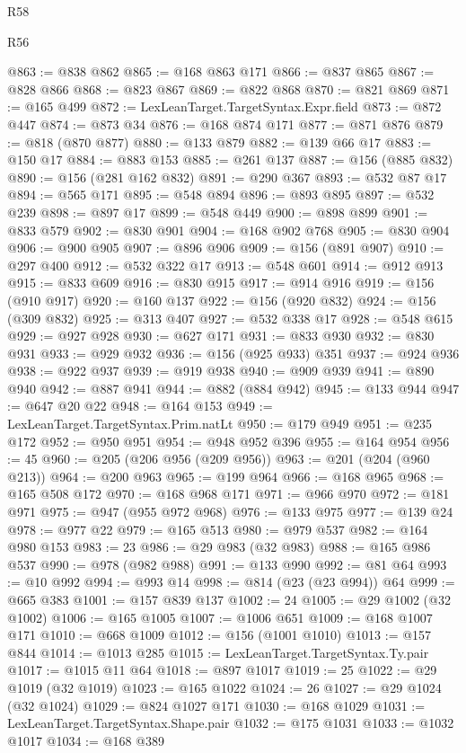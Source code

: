 \begin{lexlean}{R58}
\begin{lexlean}{R56}
\begin{coremodule}
{{{{{{{{{{{{{{{{{{{{{{{{{{{{{{{{{{{{{{{{{{{{{{{{{{{{{{{{{{{{{{{{{{{{{{{{{{{{{{{{{{{{{{{{{{{{{{{{{{{{{{{{{{{{{{{{{{{{{{{{{{{{{{{{{{{{{{{{{{{{{{{{{{{{{{{{{{{{{{{{{{{{{{{{{{{{{{{{{{{{{{{{{{{{{{{{{{{{{{{{{{{{{{{{{{{@863 := @838 @862
@865 := @168 @863 @171
@866 := @837 @865
@867 := @828 @866
@868 := @823 @867
@869 := @822 @868
@870 := @821 @869
@871 := @165 @499
@872 := LexLeanTarget.TargetSyntax.Expr.field
@873 := @872 @447
@874 := @873 @34
@876 := @168 @874 @171
@877 := @871 @876
@879 := @818 (@870 @877)
@880 := @133 @879
@882 := @139 @66 @17
@883 := @150 @17
@884 := @883 @153
@885 := @261 @137
@887 := @156 (@885 @832)
@890 := @156 (@281 @162 @832)
@891 := @290 @367
@893 := @532 @87 @17
@894 := @565 @171
@895 := @548 @894
@896 := @893 @895
@897 := @532 @239
@898 := @897 @17
@899 := @548 @449
@900 := @898 @899
@901 := @833 @579
@902 := @830 @901
@904 := @168 @902 @768
@905 := @830 @904
@906 := @900 @905
@907 := @896 @906
@909 := @156 (@891 @907)
@910 := @297 @400
@912 := @532 @322 @17
@913 := @548 @601
@914 := @912 @913
@915 := @833 @609
@916 := @830 @915
@917 := @914 @916
@919 := @156 (@910 @917)
@920 := @160 @137
@922 := @156 (@920 @832)
@924 := @156 (@309 @832)
@925 := @313 @407
@927 := @532 @338 @17
@928 := @548 @615
@929 := @927 @928
@930 := @627 @171
@931 := @833 @930
@932 := @830 @931
@933 := @929 @932
@936 := @156 (@925 @933) @351
@937 := @924 @936
@938 := @922 @937
@939 := @919 @938
@940 := @909 @939
@941 := @890 @940
@942 := @887 @941
@944 := @882 (@884 @942)
@945 := @133 @944
@947 := @647 @20 @22
@948 := @164 @153
@949 := LexLeanTarget.TargetSyntax.Prim.natLt
@950 := @179 @949
@951 := @235 @172
@952 := @950 @951
@954 := @948 @952 @396
@955 := @164 @954
@956 := 45
@960 := @205 (@206 @956 (@209 @956))
@963 := @201 (@204 (@960 @213))
@964 := @200 @963
@965 := @199 @964
@966 := @168 @965
@968 := @165 @508 @172
@970 := @168 @968 @171
@971 := @966 @970
@972 := @181 @971
@975 := @947 (@955 @972 @968)
@976 := @133 @975
@977 := @139 @24
@978 := @977 @22
@979 := @165 @513
@980 := @979 @537
@982 := @164 @980 @153
@983 := 23
@986 := @29 @983 (@32 @983)
@988 := @165 @986 @537
@990 := @978 (@982 @988)
@991 := @133 @990
@992 := @81 @64
@993 := @10 @992
@994 := @993 @14
@998 := @814 (@23 (@23 @994)) @64
@999 := @665 @383
@1001 := @157 @839 @137
@1002 := 24
@1005 := @29 @1002 (@32 @1002)
@1006 := @165 @1005
@1007 := @1006 @651
@1009 := @168 @1007 @171
@1010 := @668 @1009
@1012 := @156 (@1001 @1010)
@1013 := @157 @844
@1014 := @1013 @285
@1015 := LexLeanTarget.TargetSyntax.Ty.pair
@1017 := @1015 @11 @64
@1018 := @897 @1017
@1019 := 25
@1022 := @29 @1019 (@32 @1019)
@1023 := @165 @1022
@1024 := 26
@1027 := @29 @1024 (@32 @1024)
@1029 := @824 @1027 @171
@1030 := @168 @1029
@1031 := LexLeanTarget.TargetSyntax.Shape.pair
@1032 := @175 @1031
@1033 := @1032 @1017
@1034 := @168 @389
}}}}}}}}}}}}}}}}}}}}}}}}}}}}}}}}}}}}}}}}}}}}}}}}}}}}}}}}}}}}}}}}}}}}}}}}}}}}}}}}}}}}}}}}}}}}}}}}}}}}}}}}}}}}}}}}}}}}}}}}}}}}}}}}}}}}}}}}}}}}}}}}}}}}}}}}}}}}}}}}}}}}}}}}}}}}}}}}}}}}}}}}}}}}}}}}}}}}}}}}}}}}}}}}}}}
\end{coremodule}
\end{lexlean}
\end{lexlean}
